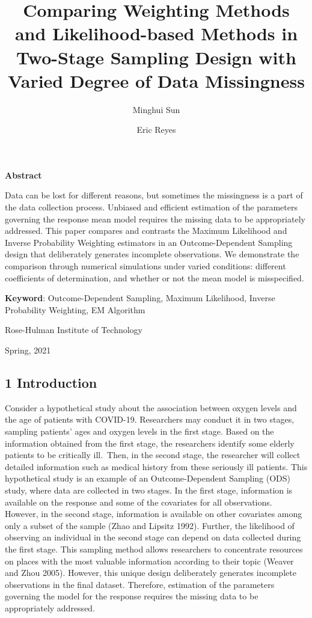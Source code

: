 \documentclass[
  12pt,
]{article}
\title{Comparing Weighting Methods and Likelihood-based Methods in
Two-Stage Sampling Design with Varied Degree of Data Missingness}
\author{Minghui Sun \and Eric Reyes}
\date{}
\begin{document}
\maketitle

\vspace{1cm}
\begin{center}
\textbf{Abstract}
\end{center}

Data can be lost for different reasons, but sometimes the missingness is
a part of the data collection process. Unbiased and efficient estimation
of the parameters governing the response mean model requires the missing
data to be appropriately addressed. This paper compares and contrasts
the Maximum Likelihood and Inverse Probability Weighting estimators in
an Outcome-Dependent Sampling design that deliberately generates
incomplete observations. We demonstrate the comparison through numerical
simulations under varied conditions: different coefficients of
determination, and whether or not the mean model is misspecified.

\textbf{Keyword}: Outcome-Dependent Sampling, Maximum Likelihood,
Inverse Probability Weighting, EM Algorithm \vfill

\begin{center}
{\fontsize{15}{18}\selectfont Rose-Hulman Institute of Technology}\par
{\fontsize{15}{18}\selectfont Spring, 2021}
\end{center}
\pagebreak

\hypertarget{introduction}{%
\subsection{1 Introduction}\label{introduction}}

Consider a hypothetical study about the association between oxygen
levels and the age of patients with COVID-19. Researchers may conduct it
in two stages, sampling patients' ages and oxygen levels in the first
stage. Based on the information obtained from the first stage, the
researchers identify some elderly patients to be critically ill.~Then,
in the second stage, the researcher will collect detailed information
such as medical history from these seriously ill patients. This
hypothetical study is an example of an Outcome-Dependent Sampling (ODS)
study, where data are collected in two stages. In the first stage,
information is available on the response and some of the covariates for
all observations. However, in the second stage, information is available
on other covariates among only a subset of the sample (Zhao and Lipsitz
1992). Further, the likelihood of observing an individual in the second
stage can depend on data collected during the first stage. This sampling
method allows researchers to concentrate resources on places with the
most valuable information according to their topic (Weaver and Zhou
2005). However, this unique design deliberately generates incomplete
observations in the final dataset. Therefore, estimation of the
parameters governing the model for the response requires the missing
data to be appropriately addressed.
\end{document}
